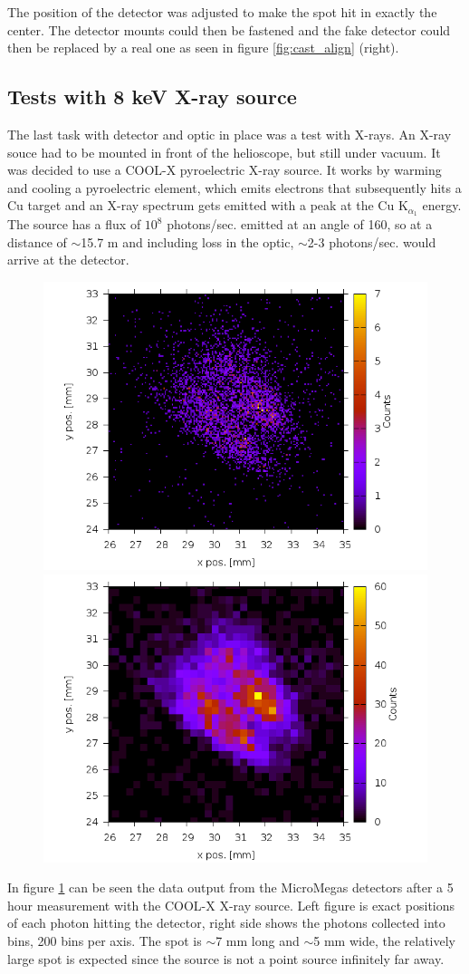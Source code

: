 The position of the detector was adjusted to make the spot hit in exactly the center. The detector mounts could then be fastened and the fake detector could then be replaced by a real one as seen in figure \ref{fig:cast_align} (right).

\subsection{Tests with 8 keV X-ray source}
The last task with detector and optic in place was a test with X-rays. An X-ray souce had to be mounted in front of the helioscope, but still under vacuum. It was decided to use a COOL-X pyroelectric X-ray source. It works by warming and cooling a pyroelectric element, which emits electrons that subsequently hits a Cu target and an X-ray spectrum gets emitted with a peak at the Cu K$_{\alpha_1}$ energy. The source has a flux of $10^8$ photons/sec. emitted at an angle of 160\degr, so at a distance of $\sim$15.7 m and including loss in the optic, $\sim$2-3 photons/sec. would arrive at the detector.

\begin{figure}[htbp]
  \centering
    \includegraphics[width=0.47\linewidth,trim=40pt 0pt 30pt 0]{figures/cast/cast_5h_1000x.png}
    \includegraphics[width=0.47\linewidth,trim=40pt 0pt 30pt 0]{figures/cast/cast_5h_200x.png}
  \caption{\footnotesize }
  \label{fig:cast_5h_run}
\end{figure}

In figure \ref{fig:cast_5h_run} can be seen the data output from the MicroMegas detectors after a 5 hour measurement with the COOL-X X-ray source. Left figure is exact positions of each photon hitting the detector, right side shows the photons collected into bins, 200 bins per axis. The spot is $\sim$7 mm long and $\sim$5 mm wide, the relatively large spot is expected since the source is not a point source infinitely far away.

